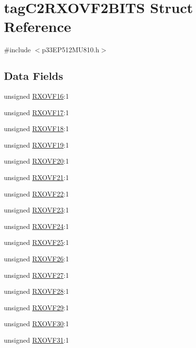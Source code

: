 \hypertarget{structtag_c2_r_x_o_v_f2_b_i_t_s}{}\section{tag\+C2\+R\+X\+O\+V\+F2\+B\+I\+TS Struct Reference}
\label{structtag_c2_r_x_o_v_f2_b_i_t_s}


{\ttfamily \#include $<$p33\+E\+P512\+M\+U810.\+h$>$}

\subsection*{Data Fields}
\begin{DoxyCompactItemize}
\item 
unsigned \hyperlink{structtag_c2_r_x_o_v_f2_b_i_t_s_a342c8863cc175b0dc4384e5edef918e6}{R\+X\+O\+V\+F16}\+:1
\item 
unsigned \hyperlink{structtag_c2_r_x_o_v_f2_b_i_t_s_a3cf20112bcf9044f2755a3ff3d54e476}{R\+X\+O\+V\+F17}\+:1
\item 
unsigned \hyperlink{structtag_c2_r_x_o_v_f2_b_i_t_s_a1911a4f43dc30c45e6ca4081bca0aee8}{R\+X\+O\+V\+F18}\+:1
\item 
unsigned \hyperlink{structtag_c2_r_x_o_v_f2_b_i_t_s_a4acf84e4adae1b4ee453194e4472a85f}{R\+X\+O\+V\+F19}\+:1
\item 
unsigned \hyperlink{structtag_c2_r_x_o_v_f2_b_i_t_s_a3648d446cd4eaaae895965ff05738d67}{R\+X\+O\+V\+F20}\+:1
\item 
unsigned \hyperlink{structtag_c2_r_x_o_v_f2_b_i_t_s_abaf88b869ba52046f953845c4d69cf0c}{R\+X\+O\+V\+F21}\+:1
\item 
unsigned \hyperlink{structtag_c2_r_x_o_v_f2_b_i_t_s_a668730c2840a2189723eff5377ff5e62}{R\+X\+O\+V\+F22}\+:1
\item 
unsigned \hyperlink{structtag_c2_r_x_o_v_f2_b_i_t_s_a83eedc147f0c997ccfdb501eee362265}{R\+X\+O\+V\+F23}\+:1
\item 
unsigned \hyperlink{structtag_c2_r_x_o_v_f2_b_i_t_s_a45aa631724dada46e3eb66a9b1505988}{R\+X\+O\+V\+F24}\+:1
\item 
unsigned \hyperlink{structtag_c2_r_x_o_v_f2_b_i_t_s_a72be421e0ad6e156da7ca671c4144498}{R\+X\+O\+V\+F25}\+:1
\item 
unsigned \hyperlink{structtag_c2_r_x_o_v_f2_b_i_t_s_a0e60593dd437fbeb9a6bc7b5aa0f567f}{R\+X\+O\+V\+F26}\+:1
\item 
unsigned \hyperlink{structtag_c2_r_x_o_v_f2_b_i_t_s_acdd1e4c715ed66c4763ee1e00cbffd13}{R\+X\+O\+V\+F27}\+:1
\item 
unsigned \hyperlink{structtag_c2_r_x_o_v_f2_b_i_t_s_ab9f3b8cd1d167c33e712b7af671d01c8}{R\+X\+O\+V\+F28}\+:1
\item 
unsigned \hyperlink{structtag_c2_r_x_o_v_f2_b_i_t_s_ad5944b9e23da912bbc3d36516e069211}{R\+X\+O\+V\+F29}\+:1
\item 
unsigned \hyperlink{structtag_c2_r_x_o_v_f2_b_i_t_s_a62c48cecd0d14e2dae174a5cc4dc96c5}{R\+X\+O\+V\+F30}\+:1
\item 
unsigned \hyperlink{structtag_c2_r_x_o_v_f2_b_i_t_s_ae24786af6ff63cf100fe8ebaabef7a74}{R\+X\+O\+V\+F31}\+:1
\end{DoxyCompactItemize}


